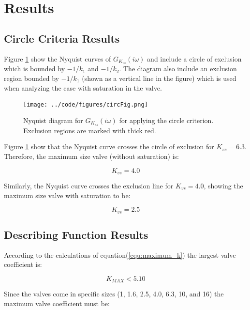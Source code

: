 \documentclass[a4paper, titlepage]{article}
\begin{document}
\section{Results}

\subsection{Circle Criteria Results}
Figure \ref{fig:circCrit} show the Nyquist curves of $G_{K_{vs}}(i\omega)$ and include a circle of exclusion which is bounded by $-1/k_{1}$ and $-1/k_{2}$.  The diagram also include an exclusion region bounded by $-1/k_{1}$ (shown as a vertical line in the figure) which is used when analyzing the case with saturation in the valve.

\begin{figure}[H]
\center
\texttt{[image: ../code/figures/circFig.png]}
\caption{Nyquist diagram for $G_{K_{vs}}(i\omega)$ for applying the circle criterion. Exclusion regions are marked with thick red.}
\label{fig:circCrit}
\end{figure}

Figure \ref{fig:circCrit} show that the Nyquist curve crosses the circle of exclusion for $K_{vs}=6.3$.  Therefore, the maximum size valve (without saturation) is:

\begin{equation}
K_{vs} = 4.0
\label{equ:k_max_wo_saturation}
\end{equation}

Similarly, the Nyquist curve crosses the exclusion line for $K_{vs}=4.0$, showing the maximum size valve with saturation to be:

\begin{equation}
K_{vs} = 2.5
\label{equ:k_max_w_saturation}
\end{equation}

\subsection{Describing Function Results}
According to the calculations of equation(\ref{equ:maximum_k}) the largest valve coefficient is:

\begin{equation}
K_{MAX} < 5.10
\label{equ:k_valid}
\end{equation}

Since the valves come in specific sizes (1, 1.6, 2.5, 4.0, 6.3, 10, and 16) the maximum valve coefficient must be:
\end{document}
